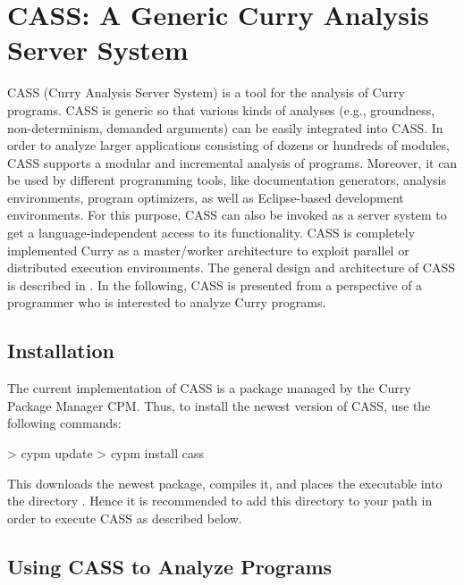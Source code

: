 \section{CASS: A Generic Curry Analysis Server System}
\label{sec-cass}

CASS
(Curry Analysis Server System)
is a tool for the analysis of Curry programs.
CASS is generic so that various kinds of analyses (e.g., groundness,
non-determinism, demanded arguments) can be easily integrated into CASS.
In order to analyze larger applications consisting of dozens or hundreds
of modules, CASS supports a modular and incremental analysis of
programs. Moreover, it can be used by different programming tools,
like documentation generators, analysis environments, program
optimizers, as well as Eclipse-based development environments. For
this purpose, CASS can also be invoked as a server system to get a
language-independent access to its functionality. CASS is completely
implemented Curry as a master/worker architecture to exploit parallel
or distributed execution environments.
The general design and architecture of CASS is described
in \cite{HanusSkrlac14}.
In the following, CASS is presented from a perspective
of a programmer who is interested to analyze Curry programs.

\subsection{Installation}

The current implementation of CASS is a package
managed by the Curry Package Manager CPM.
Thus, to install the newest version of CASS, use the following commands:
%
\begin{curry}
> cypm update
> cypm install cass
\end{curry}
%
This downloads the newest package, compiles it, and places
the executable  into the directory .
Hence it is recommended to add this directory to your path
in order to execute CASS as described below.

\subsection{Using CASS to Analyze Programs}

